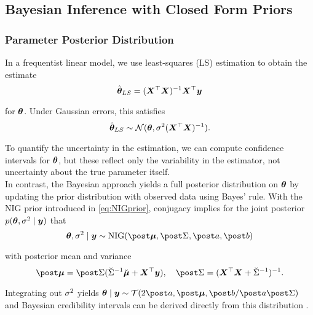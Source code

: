 \subsection{Bayesian Inference with Closed Form Priors}

\subsubsection*{Parameter Posterior Distribution}

In a frequentist linear model, we use least-squares (LS) estimation to obtain the estimate
\begin{equation}\label{eq:LSE}
    \hat{\bm{\theta}}_{LS} = (\bm{X}^\top \bm{X})^{-1} \bm{X}^\top \bm{y}
\end{equation}

for $\bm{\theta}$.
Under Gaussian errors, this satisfies
\begin{equation*}
    \hat{\bm{\theta}}_{LS} \sim \mathcal{N}(\bm{\theta}, \sigma^2 (\bm{X}^\top \bm{X})^{-1}).
\end{equation*}

To quantify the uncertainty in the estimation, we can compute confidence intervals for $\bm{\theta}$, but these reflect only the variability in the estimator, not uncertainty about the true parameter itself.\\

In contrast, the Bayesian approach yields a full posterior distribution on $\bm{\theta}$ by updating the prior distribution with observed data using Bayes' rule.
With the NIG prior introduced in \autoref{eq:NIGprior}, conjugacy implies for the joint posterior $p(\bm{\theta}, \sigma^2 \mid \bm{y})$ that
\begin{equation*}
    \btheta, \ssd \mid \by \sim \text{NIG}(\mupo, \Sdpo, \apo, \bpo)
\end{equation*}

with posterior mean and variance \footnotemark
\begin{equation} \label{eq:NIGpost}
        \mupo = \Sdpo (\Sdipri \mupri + \bX^\top \by), \quad \Sdpo = (\bX^\top \bX + \Sdipri)^{-1}.
\end{equation}


Integrating out $\sigma^2$ yields $\btheta \mid \by \sim \Tcal(2 \apo, \mupo, \bpo / \apo \Sdpo)$ and Bayesian credibility intervals can be derived directly from this distribution \citep[see e.g.][on how to do this]{held_likelihood_2020}.\\

